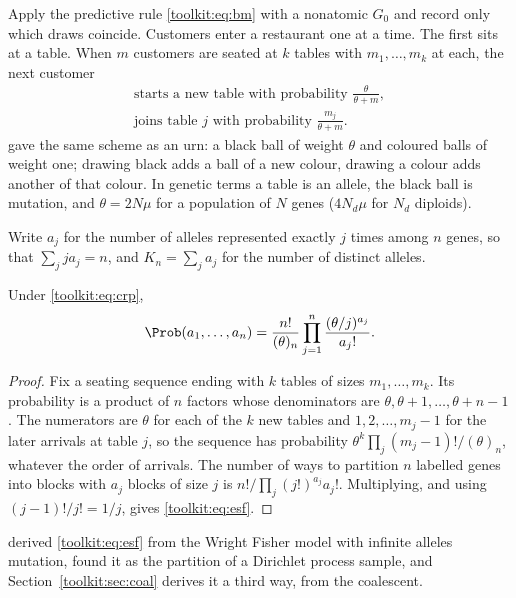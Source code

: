 Apply the predictive rule \eqref{toolkit:eq:bm} with a nonatomic $G_0$ and record only which draws
coincide. Customers enter a restaurant one at a time. The first sits at a table. When $m$
customers are seated at $k$ tables with $m_1,\dots,m_k$ at each, the next customer
\begin{equation}\label{toolkit:eq:crp}
\begin{gathered}
\text{starts a new table with probability }\frac{\theta}{\theta+m},\\
\text{joins table }j\text{ with probability }\frac{m_j}{\theta+m}.
\end{gathered}
\end{equation}
\citet{toolkit:hoppe1984} gave the same scheme as an urn: a black ball of weight $\theta$ and
coloured balls of weight one; drawing black adds a ball of a new colour, drawing a colour adds
another of that colour. In genetic terms a table is an allele, the black ball is mutation, and
$\theta=2N\mu$ for a population of $N$ genes ($4N_d\mu$ for $N_d$ diploids).

Write $a_j$ for the number of alleles represented exactly $j$ times among $n$ genes, so that
$\sum_jja_j=n$, and $K_n=\sum_ja_j$ for the number of distinct alleles.

\begin{theorem}\label{toolkit:thm:esf}
Under \eqref{toolkit:eq:crp},
\begin{equation}\label{toolkit:eq:esf}
\Prob(a_1,\dots,a_n)=\frac{n!}{(\theta)_n}\prod_{j=1}^n\frac{(\theta/j)^{a_j}}{a_j!}.
\end{equation}
\end{theorem}

\begin{proof}
Fix a seating sequence ending with $k$ tables of sizes $m_1,\dots,m_k$. Its probability is a product
of $n$ factors whose denominators are $\theta,\theta+1,\dots,\theta+n-1$. The numerators are
$\theta$ for each of the $k$ new tables and $1,2,\dots,m_j-1$ for the later arrivals at table $j$,
so the sequence has probability $\theta^k\prod_j(m_j-1)!/(\theta)_n$, whatever the order of
arrivals. The number of ways to partition $n$ labelled genes into blocks with $a_j$ blocks of size
$j$ is $n!/\prod_j(j!)^{a_j}a_j!$. Multiplying, and using $(j-1)!/j!=1/j$, gives
\eqref{toolkit:eq:esf}.
\end{proof}

\citet{toolkit:ewens1972} derived \eqref{toolkit:eq:esf} from the Wright Fisher model with
infinite alleles mutation, \citet{toolkit:antoniak1974} found it as the partition of a Dirichlet
process sample, and Section~\ref{toolkit:sec:coal} derives it a third way, from the coalescent.

